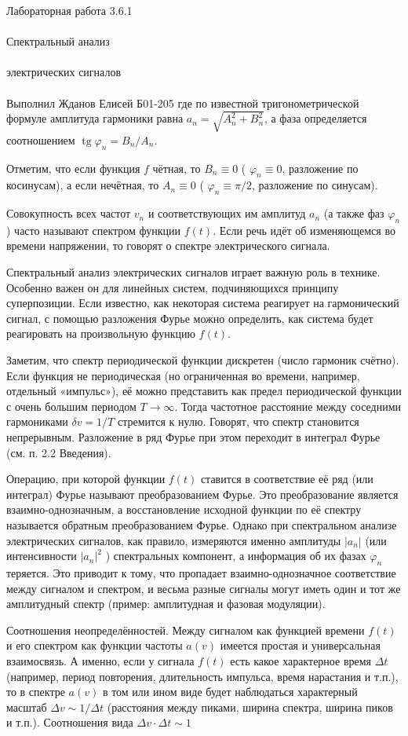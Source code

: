 \documentclass{astroedu-lab}
\begin{document}
\begin{problem}{\huge Лабораторная работа 3.6.1\\\\Спектральный анализ\\\\электрических сигналов\\\\Выполнил Жданов Елисей Б01-205}
где по известной тригонометрической формуле амплитуда гармоники равна $a_n=\sqrt{A_n^2+B_n^2}$, а фаза определяется соотношением $\operatorname{tg} \varphi_n=B_n / A_n$.

Отметим, что если функция $f$ чётная, то $B_n \equiv 0$ ( $\varphi_n \equiv 0$, разложение по косинусам), а если нечётная, то $A_n \equiv 0$ ( $\varphi_n \equiv \pi / 2$, разложение по синусам).

Совокупность всех частот $v_n$ и соответствующих им амплитуд $a_n$ (а также фаз $\varphi_n$ ) часто называют спектром функции $f(t)$. Если речь идёт об изменяющемся во времени напряжении, то говорят о спектре электрического сигнала.

Спектральный анализ электрических сигналов играет важную роль в технике. Особенно важен он для линейных систем, подчиняющихся принципу суперпозиции. Если известно, как некоторая система реагирует на гармонический сигнал, с помощью разложения Фурье можно определить, как система будет реагировать на произвольную функцию $f(t)$.

Заметим, что спектр периодической функции дискретен (число гармоник счётно). Если функция не периодическая (но ограниченная во времени, например, отдельный «импульс»), её можно представить как предел периодической функции с очень большим периодом $T \rightarrow \infty$. Тогда частотное расстояние между соседними гармониками $\delta v=1 / T$ стремится к нулю. Говорят, что спектр становится непрерывным. Разложение в ряд Фурье при этом переходит в интеграл Фурье (см. п. 2.2 Введения).

Операцию, при которой функции $f(t)$ ставится в соответствие её ряд (или интеграл) Фурье называют преобразованием Фурье. Это преобразование является взаимно-однозначным, а восстановление исходной функции по её спектру называется обратным преобразованием Фурье. Однако при спектральном анализе электрических сигналов, как правило, измеряются именно амплитуды $\left|a_n\right|$ (или интенсивности $\left|a_n\right|^2$ ) спектральных компонент, а информация об их фазах $\varphi_n$ теряется. Это приводит к тому, что пропадает взаимно-однозначное соответствие между сигналом и спектром, и весьма разные сигналы могут иметь один и тот же амплитудный спектр (пример: амплитудная и фазовая модуляции).

Соотношения неопределённостей. Между сигналом как функцией времени $f(t)$ и его спектром как функции частоты $a(v)$ имеется простая и универсальная взаимосвязь. А именно, если у сигнала $f(t)$ есть какое характерное время $\Delta t$ (например, период повторения, длительность импульса, время нарастания и т.п.), то в спектре $a(v)$ в том или ином виде будет наблюдаться характерный масштаб $\Delta v \sim 1 / \Delta t$ (расстояния между пиками, ширина спектра, ширина пиков и т.п.).
Соотношения вида
$\Delta v \cdot \Delta t \sim 1$


\end{problem}
\end{document}
